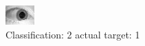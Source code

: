 \begin{figure}[h!]
\begin{center}
\includegraphics[width=0.60\columnwidth]{figures/ID1578_class_2_target_1.png}
\end{center}
\caption{ Classification: 2 actual target: 1}
\label{fig:ID1578_class_2_target_1}
\end{figure}
